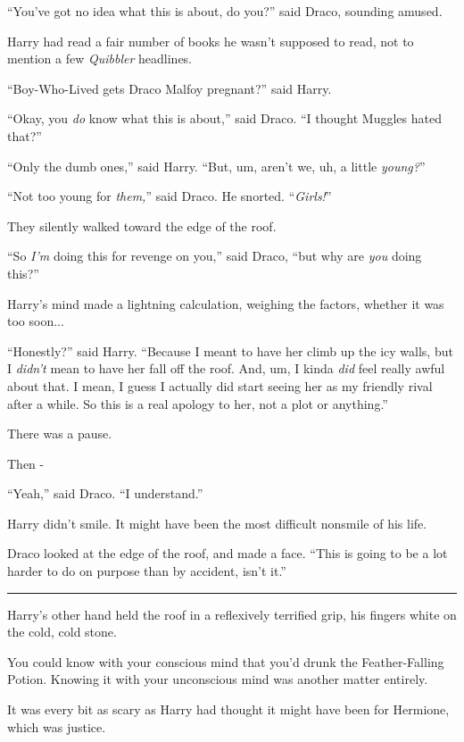 ``You've got no idea what this is about, do you?'' said Draco, sounding amused.

Harry had read a fair number of books he wasn't supposed to read, not to mention a few \emph{Quibbler} headlines.

``Boy-Who-Lived gets Draco Malfoy pregnant?'' said Harry.

``Okay, you \emph{do} know what this is about,'' said Draco. ``I thought Muggles hated that?''

``Only the dumb ones,'' said Harry. ``But, um, aren't we, uh, a little \emph{young?}''

``Not too young for \emph{them,}'' said Draco. He snorted. ``\emph{Girls!}''

They silently walked toward the edge of the roof.

``So \emph{I'm} doing this for revenge on you,'' said Draco, ``but why are \emph{you} doing this?''

Harry's mind made a lightning calculation, weighing the factors, whether it was too soon...

``Honestly?'' said Harry. ``Because I meant to have her climb up the icy walls, but I \emph{didn't} mean to have her fall off the roof. And, um, I kinda \emph{did} feel really awful about that. I mean, I guess I actually did start seeing her as my friendly rival after a while. So this is a real apology to her, not a plot or anything.''

There was a pause.

Then -

``Yeah,'' said Draco. ``I understand.''

Harry didn't smile. It might have been the most difficult nonsmile of his life.

Draco looked at the edge of the roof, and made a face. ``This is going to be a lot harder to do on purpose than by accident, isn't it.''

\begin{center}\rule{3in}{0.4pt}\end{center}

Harry's other hand held the roof in a reflexively terrified grip, his fingers white on the cold, cold stone.

You could know with your conscious mind that you'd drunk the Feather-Falling Potion. Knowing it with your unconscious mind was another matter entirely.

It was every bit as scary as Harry had thought it might have been for Hermione, which was justice.

